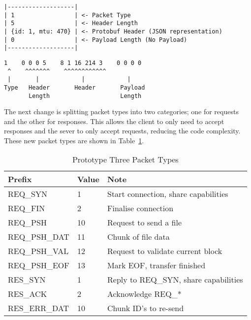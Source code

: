 \begin{minipage}{\textwidth}
    \begin{lstlisting}[caption={Prototype Three Example Packet Structure},label=lst:p3d-example-structure]
|-------------------|
| 1                 | <- Packet Type
| 5                 | <- Header Length
| {id: 1, mtu: 470} | <- Protobuf Header (JSON representation)
| 0                 | <- Payload Length (No Payload)
|-------------------|
\end{lstlisting}

    \begin{lstlisting}[caption={Prototype Three Example Packet Binary},label=lst:p3d-example-binary]
 1    0 0 0 5    8 1 16 214 3    0 0 0 0
 ^    ^^^^^^^    ^^^^^^^^^^^^
 |       |            |            |
Type   Header       Header       Payload
       Length                    Length
\end{lstlisting}
\end{minipage}

The next change is splitting packet types into two categories; one for requests and the other for responses. This allows the client to only need to accept responses and the sever to only accept requests, reducing the code complexity. These new packet types are shown in Table~\ref{tab:p3d-packet-types}.

\begin{table}[h!]
    \caption{Prototype Three Packet Types}
    \label{tab:p3d-packet-types}
    \centering
    \begin{tabular}{ l l l }
        \hline
        \textbf{Prefix} & \textbf{Value} & \textbf{Note}                         \\
        \hline
        REQ\_SYN        & 1              & Start connection, share capabilities  \\
        \hline
        REQ\_FIN        & 2              & Finalise connection                   \\
        \hline
        REQ\_PSH        & 10             & Request to send a file                \\
        \hline
        REQ\_PSH\_DAT   & 11             & Chunk of file data                    \\
        \hline
        REQ\_PSH\_VAL   & 12             & Request to validate current block     \\
        \hline
        REQ\_PSH\_EOF   & 13             & Mark EOF, transfer finished           \\
        \hline
        RES\_SYN        & 1              & Reply to REQ\_SYN, share capabilities \\
        \hline
        RES\_ACK        & 2              & Acknowledge REQ\_*                    \\
        \hline
        RES\_ERR\_DAT   & 10             & Chunk ID's to re-send                 \\
        \hline
    \end{tabular}
\end{table}

